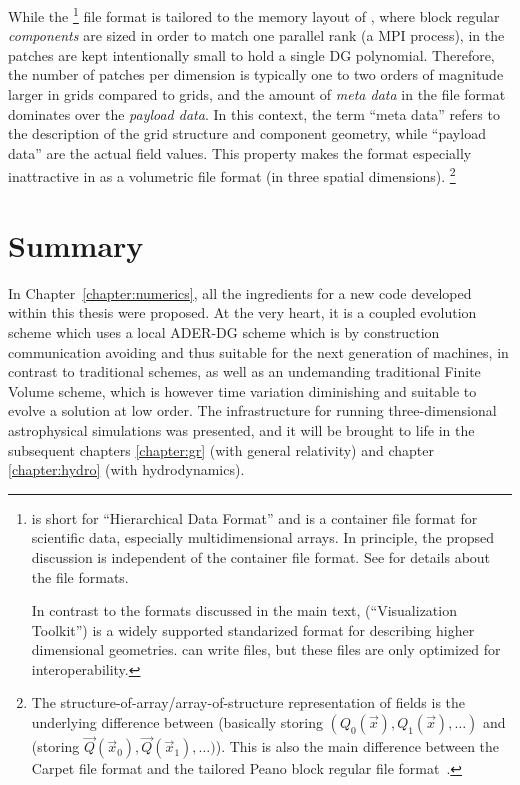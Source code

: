 While the  \footnote{
   is short for ``Hierarchical Data Format'' and is a container file format
  for scientific data, especially multidimensional arrays. In principle,
  the propsed discussion is independent of the container file format.
  See \cite{exahype-guidebook} for details about the file formats.
  
  In contrast to the formats discussed in the main text,
   (``Visualization Toolkit'') is a widely supported
  standarized format for describing higher dimensional geometries.
   can write  files, but these files are only
  optimized for interoperability.
} file format is tailored to the memory layout of
, where block regular \emph{components} are sized in order to
match one parallel rank (\ie a MPI process), in  the patches
are kept intentionally small to hold a single DG polynomial. Therefore,
the number of patches per dimension is typically one to two orders of
magnitude larger in  grids compared to  grids,
and the amount of \emph{meta data} in the  file format
dominates over the \emph{payload data}. In this context, the term ``meta
data'' refers to the description of the grid structure and component
geometry, while ``payload data'' are the actual field values. This
property makes the  format especially inattractive
in  as a volumetric file format
(\ie in three spatial dimensions). \footnote{
  The structure-of-array/array-of-structure representation of fields
  is the underlying difference between  (basically
  storing $(Q_0(\vec x), Q_1(\vec x), \dots)$ and 
  (storing $\vec Q(\vec x_0), \vec Q(\vec x_1), \dots)$).
  This is also the main difference between the Carpet file format and
  the tailored Peano block regular file format~\cite{exahype-guidebook}.
}


\section{Summary}
In Chapter~\ref{chapter:numerics}, all the ingredients for a new code developed
within this thesis were proposed. At the very heart, it is a coupled
evolution scheme which uses a local ADER-DG scheme which is by construction
communication avoiding and thus suitable for the next generation of
machines, in contrast to traditional schemes, as well as an undemanding
traditional Finite Volume scheme, which is however time variation diminishing
and suitable to evolve a solution at low order. The infrastructure
for running three-dimensional astrophysical simulations was presented, and it
will be brought to life in the subsequent chapters \vref{chapter:gr}
(with general relativity) and chapter \vref{chapter:hydro}
(with hydrodynamics).







